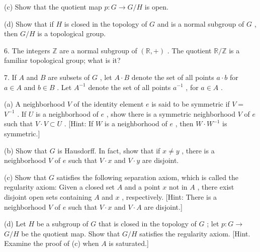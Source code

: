 (c) Show that the quotient map \(p : G \rightarrow  G/H\) is open.

(d) Show that if \(H\) is closed in the topology of \(G\) and is a normal subgroup of \(G\) , then \(G/H\) is a topological group.

6. The integers \(\mathbb{Z}\) are a normal subgroup of \(\left( {\mathbb{R}, + }\right)\) . The quotient \(\mathbb{R}/\mathbb{Z}\) is a familiar topological group; what is it?

7. If \(A\) and \(B\) are subsets of \(G\) , let \(A \cdot  B\) denote the set of all points \(a \cdot  b\) for \(a \in  A\) and \(b \in  B\) . Let \({A}^{-1}\) denote the set of all points \({a}^{-1}\) , for \(a \in  A\) .

(a) A neighborhood \(V\) of the identity element \(e\) is said to be symmetric if \(V =\)  \({V}^{-1}\) . If \(U\) is a neighborhood of \(e\) , show there is a symmetric neighborhood \(V\) of \(e\) such that \(V \cdot  V \subset  U\) . [Hint: If \(W\) is a neighborhood of \(e\) , then \(W \cdot  {W}^{-1}\) is symmetric.]

(b) Show that \(G\) is Hausdorff. In fact, show that if \(x \neq  y\) , there is a neighborhood \(V\) of \(e\) such that \(V \cdot  x\) and \(V \cdot  y\) are disjoint.

(c) Show that \(G\) satisfies the following separation axiom, which is called the regularity axiom: Given a closed set \(A\) and a point \(x\) not in \(A\) , there exist disjoint open sets containing \(A\) and \(x\) , respectively. [Hint: There is a neighborhood \(V\) of \(e\) such that \(V \cdot  x\) and \(V \cdot  A\) are disjoint.]

(d) Let \(H\) be a subgroup of \(G\) that is closed in the topology of \(G\) ; let \(p : G \rightarrow\)  \(G/H\) be the quotient map. Show that \(G/H\) satisfies the regularity axiom. [Hint. Examine the proof of (c) when \(A\) is saturated.]